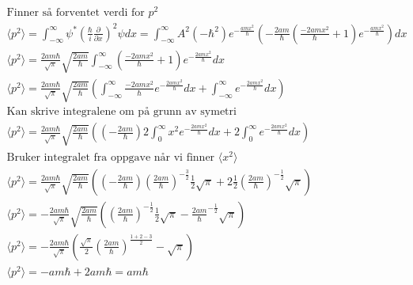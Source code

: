 \documentclass[11pt, A4paper,norsk]{article}
\begin{document}
				\begin{gather*}
\text{Finner så forventet verdi for $p^2$} \\
\langle p^2 \rangle = \int_{-\infty}^{\infty} \psi^{*} \left( \frac{\hbar}{i} \frac{\partial}{\partial x} \right)^2 \psi dx = \int_{-\infty}^{\infty} A^2 \left(- \hbar^2\right) e^{- \frac{a m x^2}{\hbar}} \left(- \frac{2am}{\hbar} \left( \frac{- 2amx^2}{\hbar} + 1 \right) e^{-\frac{amx^2}{\hbar}} \right) dx \\
\langle p^2 \rangle = \frac{2am\hbar}{\sqrt{\pi}} \sqrt{\frac{2am}{\hbar}} \int_{-\infty}^{\infty} \left( \frac{- 2amx^2}{\hbar} + 1 \right) e^{- \frac{2 a m x^2}{\hbar}} dx \\
\langle p^2 \rangle = \frac{2am\hbar}{\sqrt{\pi}} \sqrt{\frac{2am}{\hbar}} \left( \int_{-\infty}^{\infty} \frac{- 2amx^2}{\hbar} e^{- \frac{2 a m x^2}{\hbar}} dx + \int_{-\infty}^{\infty} e^{- \frac{2 a m x^2}{\hbar}} dx \right) \\
\text{Kan skrive integralene om på grunn av symetri} \\
\langle p^2 \rangle = \frac{2am\hbar}{\sqrt{\pi}} \sqrt{\frac{2am}{\hbar}} \left( \left(- \frac{2am}{\hbar} \right) 2 \int_{0}^{\infty} x^2e^{- \frac{2amx^2}{\hbar}} dx + 2 \int_{0}^{\infty} e^{- \frac{2amx^2}{\hbar}} dx \right) \\
\text{Bruker integralet fra oppgave når vi finner $\langle x^2 \rangle$} \\
\langle p^2 \rangle = \frac{2am\hbar}{\sqrt{\pi}} \sqrt{\frac{2am}{\hbar}} \left( \left(- \frac{2am}{\hbar} \right) \left( \frac{2am}{\hbar} \right)^{-\frac{3}{2}} \frac{1}{2} \sqrt{\pi} + 2 \frac{1}{2} \left( \frac{2am}{\hbar} \right)^{-\frac{1}{2}} \sqrt{\pi} \right) \\
\langle p^2 \rangle = - \frac{2am\hbar}{\sqrt{\pi}} \sqrt{\frac{2am}{\hbar}} \left(\left( \frac{2am}{\hbar} \right)^{-\frac{1}{2}} \frac{1}{2} \sqrt{\pi} - \frac{2am}{\hbar} ^{-\frac{1}{2}} \sqrt{\pi} \right) \\
\langle p^2 \rangle = - \frac{2am\hbar}{\sqrt{\pi}} \left( \frac{\sqrt{\pi}}{2} \left( \frac{2am}{\hbar} \right)^{\frac{1 + 2 - 3}{2}} - \sqrt{\pi} \right) \\
\langle p^2 \rangle = - am\hbar + 2am\hbar = am\hbar
				\end{gather*}
\end{document}
